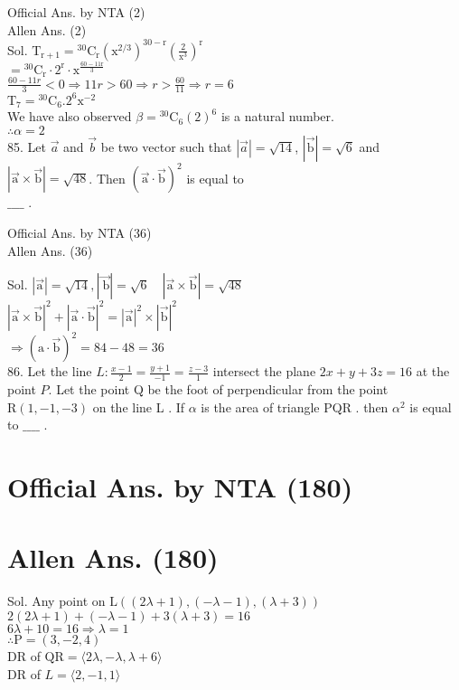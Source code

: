 \documentclass[10pt]{article}
\begin{document}
Official Ans. by NTA (2)\\
Allen Ans. (2)\\
Sol. \(\mathrm{T}_{\mathrm{r}+1}={ }^{30} \mathrm{C}_{\mathrm{r}}\left(\mathrm{x}^{2 / 3}\right)^{30-\mathrm{r}}\left(\frac{2}{\mathrm{x}^{3}}\right)^{\mathrm{r}}\)\\
\(={ }^{30} \mathrm{C}_{\mathrm{r}} \cdot 2^{\mathrm{r}} \cdot \mathrm{x}^{\frac{60-11 \mathrm{r}}{3}}\)\\
\(\frac{60-11 r}{3}<0 \Rightarrow 11 r>60 \Rightarrow r>\frac{60}{11} \Rightarrow r=6\)\\
\(\mathrm{T}_{7}={ }^{30} \mathrm{C}_{6} .2^{6} \mathrm{x}^{-2}\)\\
We have also observed \(\beta={ }^{30} \mathrm{C}_{6}(2)^{6}\) is a natural number.\\
\(\therefore \alpha=2\)\\
85. Let \(\vec{a}\) and \(\vec{b}\) be two vector such that \(|\vec{a}|=\sqrt{14}\), \(|\overrightarrow{\mathrm{b}}|=\sqrt{6}\) and \(|\overrightarrow{\mathrm{a}} \times \overrightarrow{\mathrm{b}}|=\sqrt{48}\). Then \((\overrightarrow{\mathrm{a}} \cdot \overrightarrow{\mathrm{b}})^{2}\) is equal to\\
\(\_\_\_\_\) .

Official Ans. by NTA (36)\\
Allen Ans. (36)

Sol. \(|\overrightarrow{\mathrm{a}}|=\sqrt{14},|\overrightarrow{\mathrm{~b}}|=\sqrt{6} \quad|\overrightarrow{\mathrm{a}} \times \overrightarrow{\mathrm{b}}|=\sqrt{48}\)\\
\(|\overrightarrow{\mathrm{a}} \times \overrightarrow{\mathrm{b}}|^{2}+|\overrightarrow{\mathrm{a}} \cdot \overrightarrow{\mathrm{b}}|^{2}=|\overrightarrow{\mathrm{a}}|^{2} \times|\overrightarrow{\mathrm{b}}|^{2}\)\\
\(\Rightarrow(\mathrm{a} \cdot \overrightarrow{\mathrm{b}})^{2}=84-48=36\)\\
86. Let the line \(L: \frac{x-1}{2}=\frac{y+1}{-1}=\frac{z-3}{1}\) intersect the plane \(2 x+y+3 z=16\) at the point \(P\). Let the point Q be the foot of perpendicular from the point \(\mathrm{R}(1,-1,-3)\) on the line L . If \(\alpha\) is the area of triangle PQR . then \(\alpha^{2}\) is equal to \(\_\_\_\_\) .

\section*{Official Ans. by NTA (180)}
\section*{Allen Ans. (180)}
Sol. Any point on \(\mathrm{L}((2 \lambda+1),(-\lambda-1),(\lambda+3))\)\\
\(2(2 \lambda+1)+(-\lambda-1)+3(\lambda+3)=16\)\\
\(6 \lambda+10=16 \Rightarrow \lambda=1\)\\
\(\therefore \mathrm{P}=(3,-2,4)\)\\
DR of \(\mathrm{QR}=\langle 2 \lambda,-\lambda, \lambda+6\rangle\)\\
DR of \(L=\langle 2,-1,1\rangle\)
\end{document}
